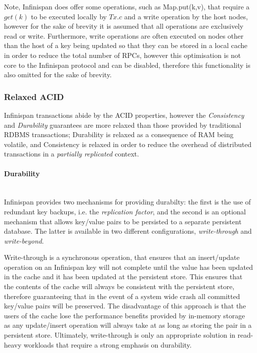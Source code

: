 		Note, Infinispan does offer some operations, such as \textsf{Map.put(k,v)}, that require a $get(k)$ to be executed locally by $Tx.c$ and a write operation by the host nodes, however for the sake of brevity it is assumed that all operations are exclusively read or write.  Furthermore, write operations are often executed on nodes other than the host of a key being updated so that they can be stored in a local cache in order to reduce the total number of RPCs, however this optimisation is not core to the Infinispan protocol and can be disabled, therefore this functionality is also omitted for the sake of brevity.  
    
	    \subsubsection{Relaxed ACID}
	    Infinispan transactions abide by the ACID\citep{Haerder:1983:PTD:289.291} properties, however the \emph{Consistency} and \emph{Durability} guarantees are more relaxed than those provided by traditional RDBMS transactions; Durability is relaxed as a consequence of RAM being volatile, and Consistency is relaxed in order to reduce the overhead of distributed transactions in a \emph{partially replicated} context.  
	    
		    \paragraph{Durability} \hspace{0pt} \\
		    Infinispan provides two mechanisms for providing durabilty: the first is the use of redundant key backups, i.e. the \emph{replication factor}, and the second is an optional mechanism that allows key/value pairs to be persisted to a separate persistent database.  The latter is available in two different configurations, \emph{write-through} and \emph{write-beyond}. 
		    
		    Write-through is a synchronous operation, that ensures that an insert/update operation on an Infinispan key will not complete until the value has been updated in the cache and it has been updated at the persistent store.  This ensures that the contents of the cache will always be consistent with the persistent store, therefore guaranteeing that in the event of a system wide crash all committed key/value pairs will be preserved.  The disadvantage of this approach is that the users of the cache lose the performance benefits provided by in-memory storage as any update/insert operation will always take at as long as storing the pair in a persistent store.  Ultimately, write-through is only an appropriate solution in read-heavy workloads that require a strong emphasis on durability.  
		    
